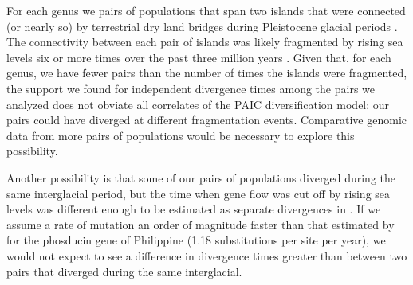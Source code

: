 

For each genus we   pairs of populations that span two
islands that were connected (or nearly so) by terrestrial dry land bridges
during Pleistocene glacial periods
.
The connectivity between each pair of islands was likely fragmented by rising
sea levels six or more times over the past three million years
.
Given that, for each genus, we have fewer pairs than the number of times the
islands were fragmented,
the support we found for independent divergence times among the pairs we
analyzed does not obviate all correlates of the PAIC diversification model;
our pairs could have diverged at different fragmentation events.
Comparative genomic data from more pairs of populations would be necessary to
explore this possibility.


Another possibility is that some of our pairs of populations diverged during
the same interglacial period, but the time when gene flow was cut off by rising
sea levels was different enough to be estimated as separate divergences in
\ecoevolity.
If we assume a rate of mutation an order of magnitude faster than that
estimated by \citet{Siler2012} for the phosducin gene of Philippine 
(1.18 substitutions per site per year),
we would not expect to see a difference in divergence times greater than
 
between two pairs that diverged during the same interglacial.

